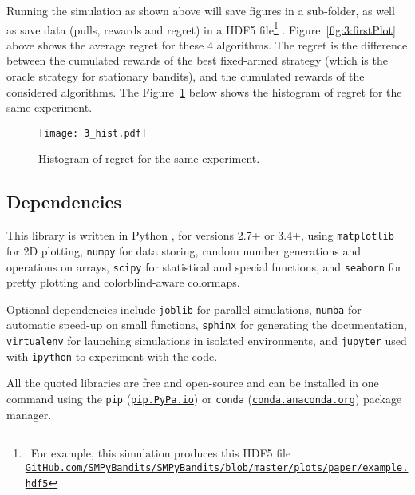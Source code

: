 Running the simulation as shown above will save figures in a sub-folder, as well as save data (pulls, rewards and regret) in a HDF5 file\footnote{~For example, this simulation produces this HDF5 file\\\texttt{\href{https://github.com/SMPyBandits/SMPyBandits/blob/master/plots/paper/example.hdf5}{GitHub.com/SMPyBandits/SMPyBandits/blob/master/plots/paper/example.hdf5}}}
\cite{h5py}.
Figure~\ref{fig:3:firstPlot} above shows the average regret for these $4$ algorithms.
The regret is the difference between the cumulated rewards of the best fixed-armed strategy (which is the oracle strategy for stationary bandits), and the cumulated rewards of the considered algorithms.
The Figure~\ref{fig:3:firstPlot_hist} below shows the histogram of regret for the same experiment.

\begin{figure}[h!]  %
	\texttt{[image: 3\_hist.pdf]}
	\caption{Histogram of regret for the same experiment.}
	\label{fig:3:firstPlot_hist}
\end{figure}


\subsection{Dependencies}

This library is written in Python \cite{python}, for versions 2.7+ or 3.4+, using \texttt{matplotlib} \cite{matplotlib} for 2D plotting, \texttt{numpy} \cite{numpy} for data storing, random number generations and operations on arrays, \texttt{scipy} \cite{scipy} for statistical and special functions, and \texttt{seaborn} \cite{seaborn} for pretty plotting and colorblind-aware colormaps.

Optional dependencies include \texttt{joblib} \cite{joblib} for parallel simulations, \texttt{numba} \cite{numba} for automatic speed-up on small functions, \texttt{sphinx} \cite{sphinx} for generating the documentation, \texttt{virtualenv} \cite{virtualenv} for launching simulations in isolated environments, and \texttt{jupyter} \cite{jupyter} used with \texttt{ipython} \cite{ipython} to experiment with the code.

All the quoted libraries are free and open-source and can be installed in one command using the \texttt{pip} (\texttt{\href{https://pip.pypa.io/}{pip.PyPa.io}}) or \texttt{conda} (\texttt{\href{http://conda.anaconda.org/}{conda.anaconda.org}}) package manager.


